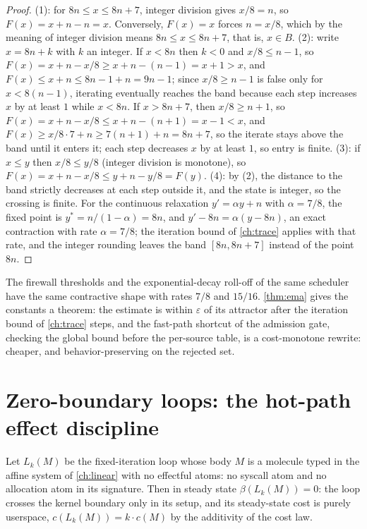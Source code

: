 \begin{proof}
(1): for $8n \leq x \leq 8n+7$, integer division gives $x/8 = n$, so
$F (x) = x + n - n = x$. Conversely, $F (x) = x$ forces $n = x/8$,
which by the meaning of integer division means $8n \leq x \leq 8n+7$,
that is, $x \in B$.
(2): write $x = 8n + k$ with $k$ an integer. If $x < 8n$ then $k < 0$
and $x/8 \leq n-1$, so $F (x) = x + n - x/8 \geq x + n - (n-1) = x+1 > x$,
and $F (x) \leq x + n \leq 8n - 1 + n = 9n - 1$; since $x/8 \geq n-1$
is false only for $x < 8 (n-1)$, iterating eventually reaches the band
because each step increases $x$ by at least $1$ while $x < 8n$. If
$x > 8n+7$, then $x/8 \geq n+1$, so
$F (x) = x + n - x/8 \leq x + n - (n+1) = x - 1 < x$, and
$F (x) \geq x/8 \cdot 7 + n \geq 7 (n+1) + n = 8n+7$, so the iterate
stays above the band until it enters it; each step decreases $x$ by at
least $1$, so entry is finite.
(3): if $x \leq y$ then $x/8 \leq y/8$ (integer division is monotone),
so $F (x) = x + n - x/8 \leq y + n - y/8 = F (y)$.
(4): by (2), the distance to the band strictly decreases at each step
outside it, and the state is integer, so the crossing is finite. For
the continuous relaxation $y' = \alpha y + n$ with $\alpha = 7/8$, the
fixed point is $y^{*} = n/(1-\alpha) = 8n$, and
$y' - 8n = \alpha (y - 8n)$, an exact contraction with rate
$\alpha = 7/8$; the iteration bound of \autoref{ch:trace} applies with
that rate, and the integer rounding leaves the band $[8n, 8n+7]$
instead of the point $8n$.
\end{proof}

\begin{remark}
The firewall thresholds and the exponential-decay roll-off of the
same scheduler have the same contractive shape with rates $7/8$ and
$15/16$. \autoref{thm:ema} gives the constants a theorem: the estimate
is within $\varepsilon$ of its attractor after the iteration bound of
\autoref{ch:trace} steps, and the fast-path shortcut of the admission
gate, checking the global bound before the per-source table, is a
cost-monotone rewrite: cheaper, and behavior-preserving on the
rejected set.
\end{remark}

\section{Zero-boundary loops: the hot-path effect discipline}\label{sec:zero-boundary}

\begin{theorem}\label{thm:zero-boundary}
Let $L_k (M)$ be the fixed-iteration loop whose body $M$ is a molecule
typed in the affine system of \autoref{ch:linear} with no effectful
atoms: no syscall atom and no allocation atom in its signature. Then
in steady state $\beta (L_k (M)) = 0$: the loop crosses the kernel
boundary only in its setup, and its steady-state cost is purely
userspace, $c (L_k (M)) = k \cdot c (M)$ by the additivity of the cost
law.
\end{theorem}

